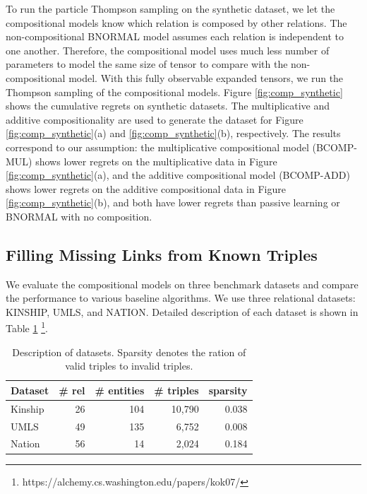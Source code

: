 To run the particle Thompson sampling on the synthetic dataset, we let the 
compositional models know which relation is composed by other relations. 
The non-compositional BNORMAL model assumes each relation is independent to one another. 
Therefore, the compositional model uses much less number of parameters to model 
the same size of tensor to compare with the non-compositional model. 
With this fully observable expanded tensors, we run the Thompson sampling of 
the compositional models.
Figure \ref{fig:comp_synthetic} shows the cumulative regrets on synthetic 
datasets. The multiplicative and additive compositionality are used to 
generate the dataset for Figure \ref{fig:comp_synthetic}(a) and 
\ref{fig:comp_synthetic}(b), respectively. The results correspond to our 
assumption: the multiplicative compositional model (BCOMP-MUL) shows lower 
regrets on the multiplicative data in Figure \ref{fig:comp_synthetic}(a), and 
the additive compositional model (BCOMP-ADD) shows lower regrets on the 
additive compositional data in Figure \ref{fig:comp_synthetic}(b), 
and both have lower regrets than passive learning or BNORMAL with no composition. 

\subsection{Filling Missing Links from Known Triples}
We evaluate the compositional models on three benchmark datasets and compare the performance to various baseline 
algorithms. We use three relational datasets: KINSHIP, UMLS, and NATION. Detailed description of each 
dataset is shown in Table \ref{tbl:dataset} \footnote{https://alchemy.cs.washington.edu/papers/kok07/}.

\begin{table}[t]
\centering
\caption{\label{tbl:dataset}Description of datasets. 
Sparsity denotes the ration of valid triples to invalid triples.}
\vskip 0.15in
\begin{tabular}{l | r | r | r | r}
Dataset &  \# rel & \# entities & \# triples & sparsity \\ \hline
Kinship & 26 & 104  & 10,790 & 0.038 \\
UMLS & 49 &135  & 6,752 & 0.008 \\
Nation & 56 & 14  & 2,024 & 0.184 \\
\end{tabular}
\end{table}


